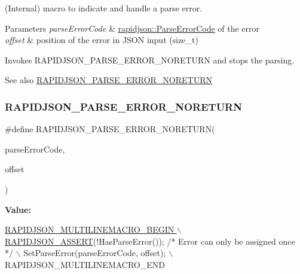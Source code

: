 (Internal) macro to indicate and handle a parse error. 


\begin{DoxyParams}{Parameters}
{\em parse\+Error\+Code} & \hyperlink{group___r_a_p_i_d_j_s_o_n___e_r_r_o_r_s_ga8d4b32dfc45840bca189ade2bbcb6ba7}{rapidjson\+::\+Parse\+Error\+Code} of the error \\
\hline
{\em offset} & position of the error in J\+S\+ON input ({\ttfamily size\+\_\+t})\\
\hline
\end{DoxyParams}
Invokes R\+A\+P\+I\+D\+J\+S\+O\+N\+\_\+\+P\+A\+R\+S\+E\+\_\+\+E\+R\+R\+O\+R\+\_\+\+N\+O\+R\+E\+T\+U\+RN and stops the parsing.

\begin{DoxySeeAlso}{See also}
\hyperlink{group___r_a_p_i_d_j_s_o_n___e_r_r_o_r_s_ga7f8c4265b2edda78568ae3338aaf1461}{R\+A\+P\+I\+D\+J\+S\+O\+N\+\_\+\+P\+A\+R\+S\+E\+\_\+\+E\+R\+R\+O\+R\+\_\+\+N\+O\+R\+E\+T\+U\+RN} 
\end{DoxySeeAlso}
\mbox{\label{group___r_a_p_i_d_j_s_o_n___e_r_r_o_r_s_ga7f8c4265b2edda78568ae3338aaf1461}} 
\subsubsection{\texorpdfstring{R\+A\+P\+I\+D\+J\+S\+O\+N\+\_\+\+P\+A\+R\+S\+E\+\_\+\+E\+R\+R\+O\+R\+\_\+\+N\+O\+R\+E\+T\+U\+RN}{RAPIDJSON\_PARSE\_ERROR\_NORETURN}}
{\footnotesize\ttfamily \#define R\+A\+P\+I\+D\+J\+S\+O\+N\+\_\+\+P\+A\+R\+S\+E\+\_\+\+E\+R\+R\+O\+R\+\_\+\+N\+O\+R\+E\+T\+U\+RN(\begin{DoxyParamCaption}\item[{}]{parse\+Error\+Code,  }\item[{}]{offset }\end{DoxyParamCaption})}

{\bfseries Value\+:}
\begin{DoxyCode}
\hyperlink{group___r_a_p_i_d_j_s_o_n___c_o_n_f_i_g_gabeba18d612187bad2ac62aed9276d47c}{RAPIDJSON\_MULTILINEMACRO\_BEGIN \(\backslash\)}
\hyperlink{group___r_a_p_i_d_j_s_o_n___c_o_n_f_i_g_gabeba18d612187bad2ac62aed9276d47c}{    RAPIDJSON\_ASSERT}(!HasParseError()); \textcolor{comment}{/* Error can only be assigned once */} \(\backslash\)
    SetParseError(parseErrorCode, offset); \(\backslash\)
    RAPIDJSON\_MULTILINEMACRO\_END
\end{DoxyCode}


